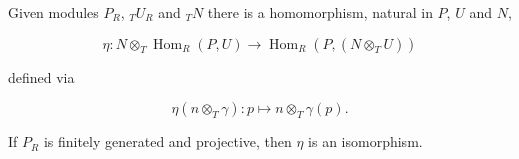 Given modules $P_R$, ${}_T U_R$ and ${}_T N$ there is a homomorphism, natural in $P$, $U$ and $N$,

$$\eta: N \otimes_T \operatorname{Hom}_R(P, U) \to \operatorname{Hom}_R(P, (N \otimes_T U))$$

defined via

$$\eta(n \otimes_T \gamma): p \mapsto n \otimes_T \gamma(p).$$

If $P_R$ is finitely generated and projective, then $\eta$ is an isomorphism.
